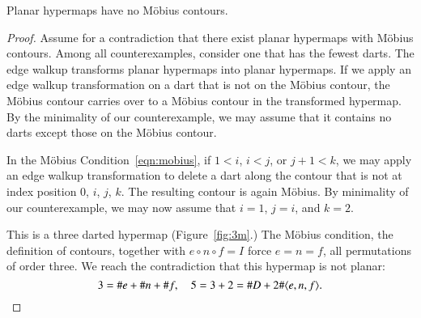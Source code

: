 \begin{lemma}  Planar hypermaps have no M\"obius contours.
\end{lemma}

\begin{proof} Assume for a contradiction that there exist planar
hypermaps with M\"obius contours.  Among all counterexamples,
consider one that has the fewest darts.  The edge walkup transforms
planar hypermaps into planar hypermaps.  If we apply an edge walkup
transformation on a dart that is not on the M\"obius contour, the
M\"obius contour carries over to a M\"obius contour 
in the transformed hypermap.  By the
minimality of our counterexample, we may assume that it contains no
darts except those on the M\"obius contour.

In the M\"obius Condition~\ref{eqn:mobius}, if $1<i$, $i<j$, or
$j+1<k$, we may apply an edge walkup transformation to  delete a
dart along the contour that is not at index position $0$, $i$,
$j$, $k$.  The resulting contour is again M\"obius.
By minimality of our counterexample, we may now assume
that $i=1$, $j=i$, and $k=2$.

This is a three darted hypermap (Figure~\ref{fig:3m}.)  
The M\"obius condition, the
definition of contours, together with $e\circ n\circ f=I$ force
$e=n=f$, all permutations of order three. We reach the contradiction
that this hypermap is not planar:
    $$3 = \# e + \# n + \# f,\quad 5 = 3+2 = \# D + 2 \#\langle e,n,f\rangle.$$
\end{proof}

